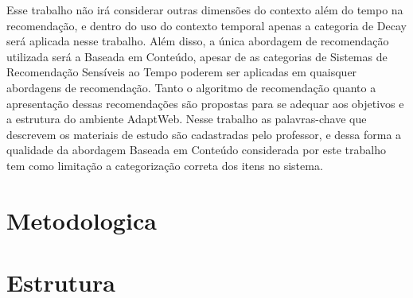 Esse trabalho não irá considerar outras dimensões do contexto além do tempo na recomendação, e dentro do uso do contexto
temporal apenas a categoria de Decay será aplicada nesse trabalho. Além disso, a única abordagem de recomendação
utilizada será a Baseada em Conteúdo, apesar de as categorias de Sistemas de Recomendação Sensíveis ao Tempo poderem ser
aplicadas em quaisquer abordagens de recomendação. Tanto o algoritmo de recomendação quanto a apresentação dessas
recomendações são propostas para se adequar aos objetivos e a estrutura do ambiente AdaptWeb\textsuperscript{\textregistered}.
Nesse trabalho as palavras-chave que descrevem os materiais de estudo são cadastradas pelo professor, e dessa forma a
qualidade da abordagem Baseada em Conteúdo considerada por este trabalho tem como limitação a categorização correta dos
itens no sistema.

\section{Metodologica}

\section{Estrutura}



